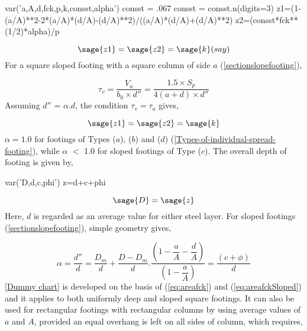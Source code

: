 \begin{sagesilent}
  var('a,A,d,fck,p,k,consst,alpha')
  consst = .067
  consst = consst.n(digits=3)
  z1=(1-(a/A)**2-2*(a/A)*(d/A)-(d/A)**2)/((a/A)*(d/A)+(d/A)**2)
  z2=(consst*fck**(1/2)*alpha)/p
\end{sagesilent}

\begin{equation}
  \label{eq:areafck}
  \sage{z1}=\sage{z2}=\sage{k} (say)
\end{equation}
For a square sloped footing with a square column of side $a$
(\fig \ref{sectionslopefooting}),
 
\begin{equation}
\label{eq:shearSquare}
\tau_{v} = \frac{V_{u}}{b_{0} \times d''}
=\frac{1.5 \times {S_p}}{4(a + d) \times d''}
\end{equation}
Assuming $d''$ = $ \alpha . d $, the condition $\tau_{v} = \tau_{a}$
 gives,

\begin{equation} 
 \label{eq:areafckSloped}
  \sage{z1}=\sage{z2}=\sage{k}                                   
\end{equation} 
$\alpha = 1.0$ for footings of Types ($a$), ($b$) and ($d$) 
(\fig \ref{Types-of-individual-spread-footing}),
while $\alpha$ $<$ 1.0 for sloped footings of Type ($c$). The overall
depth of footing is given by,

\begin{sagesilent}
  var('D,d,c,phi')
  z=d+c+phi
\end{sagesilent}

\begin{equation}
  \label{eq:depth-cover}
  \sage{D}=\sage{z}
\end{equation}
Here, $d$ is regarded as an average value for either steel layer. For
sloped footings  (\fig \ref{sectionslopefooting}), simple geometry
gives,

\begin{equation}
\label{eq:shape}
\alpha = \frac{d''}{d} = \frac{{D_m}}{d} + \frac{D - {D_m}}{d}.
\frac{\left(1 - \dfrac{a}{A} - \dfrac{d}{A}\right)}
{\left(1 - \dfrac{a}{A}\right)}=\dfrac{(c+\phi)}{d}
\end{equation}
\chartm \ref{Dummy chart} is developed on the basis of
\eqn (\ref{eq:areafck}) and (\ref{eq:areafckSloped}) and it
applies to both uniformly deep and sloped square footings. It can also
be used for rectangular footings with rectangular columns by using 
average values of $a$ and $A$, provided an equal overhang is left on
all sides of column, which requires,

